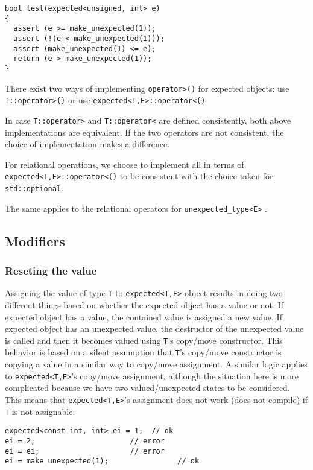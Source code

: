 \documentclass[a4paper,10pt]{article}
\newcommand{\cpp}[1]{\lstinline{#1}}
\begin{document}
\begin{lstlisting}
bool test(expected<unsigned, int> e)
{
  assert (e >= make_unexpected(1));    
  assert (!(e < make_unexpected(1)));  
  assert (make_unexpected(1) <= e);    
  return (e > make_unexpected(1));     
}
\end{lstlisting}

There exist two ways of implementing \cpp{operator>()} for expected objects: use \cpp{T::operator>()} or use \cpp{expected<T,E>::operator<()}

In case \cpp{T::operator>} and \cpp{T::operator<} are defined consistently, both above implementations are equivalent. If the two operators are not consistent, the choice of implementation makes a difference. 

For relational operations, we choose to implement all in terms of  \cpp{expected<T,E>::operator<()} to be consistent with the choice taken for \cpp{std::optional}.

The same applies to the relational operators for \cpp{unexpected_type<E>} .

\subsection{Modifiers}

\subsubsection{Reseting the value}

Assigning the value of type \cpp{T} to \cpp{expected<T,E>} object results in doing two different things based on whether the expected object has a value or not. If expected object has a value, the contained value is assigned a new value. If expected object has an unexpected value, the destructor of the unexpected value is called and then it becomes valued using \cpp{T}'s copy/move constructor. This behavior is based on a silent assumption that \cpp{T}'s copy/move constructor is copying a value in a similar way to copy/move assignment. A similar logic applies to \cpp{expected<T,E>}'s copy/move assignment, although the situation here is more complicated because we have two valued/unexpected states to be considered. This means that \cpp{expected<T,E>}'s assignment does not work (does not compile) if \cpp{T} is not assignable:

\begin{lstlisting}
expected<const int, int> ei = 1;  // ok
ei = 2;                      // error 
ei = ei;                     // error 
ei = make_unexpected(1);                // ok
\end{lstlisting}
\end{document}
